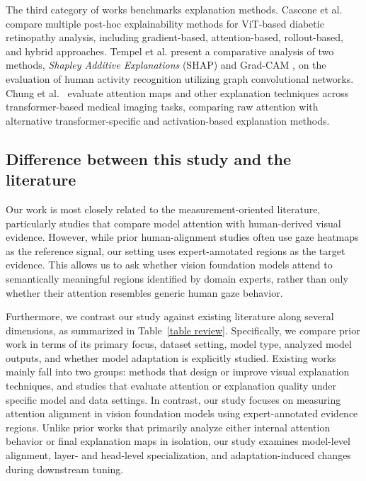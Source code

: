 \documentclass[lineno,pdflatex,sn-mathphys-num]{sn-jnl}%
\theoremstyle{thmstyleone}%
\theoremstyle{thmstyletwo}%
\theoremstyle{thmstylethree}%
\begin{document}
The third category of works benchmarks explanation methods. Cascone et al.~\cite{Cascone2026947} compare multiple post-hoc explainability methods for ViT-based diabetic retinopathy analysis, including gradient-based, attention-based, rollout-based, and hybrid approaches. Tempel et al. \cite{Tempel2025} present a comparative analysis of two methods, \textit{Shapley Additive Explanations} (SHAP) \cite{Lundberg17SHAP} and Grad-CAM \cite{Selvaraju17GradCAM}, on the evaluation of human activity recognition utilizing graph convolutional networks. Chung et al.~\cite{Chung2025110} evaluate attention maps and other explanation techniques across transformer-based medical imaging tasks, comparing raw attention with alternative transformer-specific and activation-based explanation methods.

\subsection{Difference between this study and the literature}

Our work is most closely related to the measurement-oriented literature, particularly studies that compare model attention with human-derived visual evidence. However, while prior human-alignment studies often use gaze heatmaps as the reference signal, our setting uses expert-annotated regions as the target evidence. This allows us to ask whether vision foundation models attend to semantically meaningful regions identified by domain experts, rather than only whether their attention resembles generic human gaze behavior.

Furthermore, we contrast our study against existing literature along several dimensions, as summarized in Table~\ref{table review}. Specifically, we compare prior work in terms of its primary focus, dataset setting, model type, analyzed model outputs, and whether model adaptation is explicitly studied. Existing works mainly fall into two groups: methods that design or improve visual explanation techniques, and studies that evaluate attention or explanation quality under specific model and data settings. In contrast, our study focuses on measuring attention alignment in vision foundation models using expert-annotated evidence regions. Unlike prior works that primarily analyze either internal attention behavior or final explanation maps in isolation, our study examines model-level alignment, layer- and head-level specialization, and adaptation-induced changes during downstream tuning.
\end{document}
